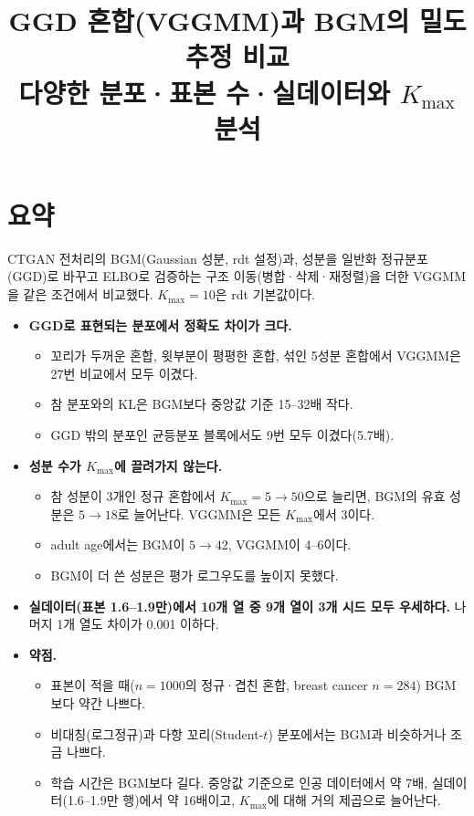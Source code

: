 \documentclass[11pt]{article}
\title{GGD 혼합(VGGMM)과 BGM의 밀도 추정 비교\\[2pt]\large 다양한 분포·표본 수·실데이터와 $K_{\max}$ 분석}
\author{}
\date{}
\begin{document}
\maketitle

\section{요약}

CTGAN 전처리의 BGM(Gaussian 성분, rdt 설정)과, 성분을 일반화 정규분포(GGD)로 바꾸고 ELBO로 검증하는 구조 이동(병합·삭제·재정렬)을 더한 VGGMM을 같은 조건에서 비교했다. $K_{\max}=10$은 rdt 기본값이다.

\begin{itemize}
  \item \textbf{GGD로 표현되는 분포에서 정확도 차이가 크다.}
    \begin{itemize}
      \item 꼬리가 두꺼운 혼합, 윗부분이 평평한 혼합, 섞인 5성분 혼합에서 VGGMM은 27번 비교에서 모두 이겼다.
      \item 참 분포와의 KL은 BGM보다 중앙값 기준 15--32배 작다.
      \item GGD 밖의 분포인 균등분포 블록에서도 9번 모두 이겼다(5.7배).
    \end{itemize}
  \item \textbf{성분 수가 $K_{\max}$에 끌려가지 않는다.}
    \begin{itemize}
      \item 참 성분이 3개인 정규 혼합에서 $K_{\max}=5\to50$으로 늘리면, BGM의 유효 성분은 $5\to18$로 늘어난다. VGGMM은 모든 $K_{\max}$에서 3이다.
      \item adult age에서는 BGM이 $5\to42$, VGGMM이 4--6이다.
      \item BGM이 더 쓴 성분은 평가 로그우도를 높이지 못했다.
    \end{itemize}
  \item \textbf{실데이터(표본 1.6--1.9만)에서 10개 열 중 9개 열이 3개 시드 모두 우세하다.} 나머지 1개 열도 차이가 0.001 이하다.
  \item \textbf{약점.}
    \begin{itemize}
      \item 표본이 적을 때($n=1000$의 정규·겹친 혼합, breast cancer $n=284$) BGM보다 약간 나쁘다.
      \item 비대칭(로그정규)과 다항 꼬리(Student-$t$) 분포에서는 BGM과 비슷하거나 조금 나쁘다.
      \item 학습 시간은 BGM보다 길다. 중앙값 기준으로 인공 데이터에서 약 7배, 실데이터(1.6--1.9만 행)에서 약 16배이고, $K_{\max}$에 대해 거의 제곱으로 늘어난다.
    \end{itemize}
\end{itemize}
\end{document}
